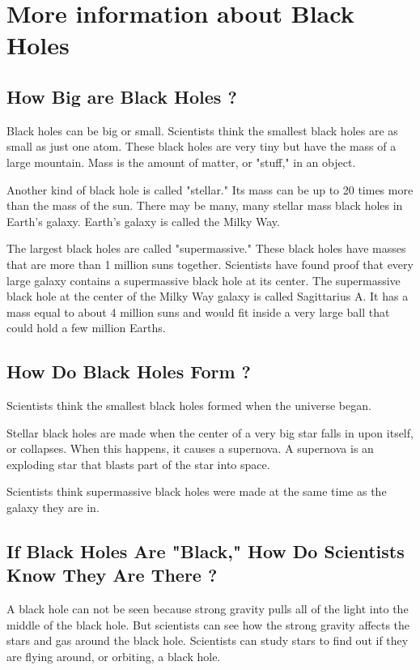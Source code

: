 \documentclass[15pt]{article}
\begin{document}
	\pagebreak
	

	\section{More information about Black Holes}

		\subsection{How Big are Black Holes ?}
			Black holes can be big or small. Scientists think the smallest black holes are as small as just one atom. These black holes are very tiny but have the mass of a large mountain. Mass is the amount of matter, or "stuff," in an object.
		
			Another kind of black hole is called "stellar." Its mass can be up to 20 times more than the mass of the sun. There may be many, many stellar mass black holes in Earth's galaxy. Earth's galaxy is called the Milky Way.
			
			The largest black holes are called "supermassive." These black holes have masses that are more than 1 million suns together. Scientists have found proof that every large galaxy contains a supermassive black hole at its center. The supermassive black hole at the center of the Milky Way galaxy is called Sagittarius A. It has a mass equal to about 4 million suns and would fit inside a very large ball that could hold a few million Earths.
		
		\subsection{How Do Black Holes Form ?}
			Scientists think the smallest black holes formed when the universe began.
			
			Stellar black holes are made when the center of a very big star falls in upon itself, or collapses. When this happens, it causes a supernova. A supernova is an exploding star that blasts part of the star into space.
			
			Scientists think supermassive black holes were made at the same time as the galaxy they are in.
		
		\subsection{If Black Holes Are "Black," How Do Scientists Know They Are There ?}
			A black hole can not be seen because strong gravity pulls all of the light into the middle of the black hole. But scientists can see how the strong gravity affects the stars and gas around the black hole. Scientists can study stars to find out if they are flying around, or orbiting, a black hole.
			
\end{document}
